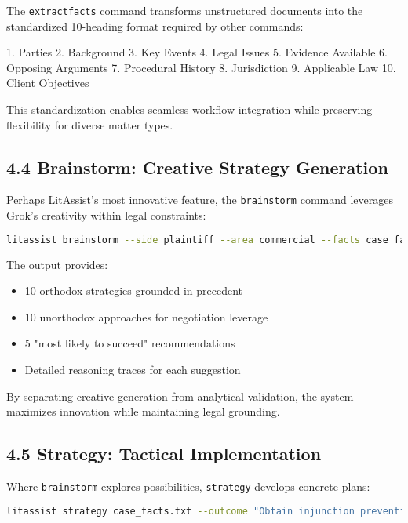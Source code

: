 \documentclass[12pt,a4paper]{article}
\begin{document}
The \texttt{extractfacts} command transforms unstructured documents into the standardized 10-heading format required by other commands:

1. Parties
2. Background  
3. Key Events
4. Legal Issues
5. Evidence Available
6. Opposing Arguments
7. Procedural History
8. Jurisdiction
9. Applicable Law
10. Client Objectives

This standardization enables seamless workflow integration while preserving flexibility for diverse matter types.

\subsection*{4.4 Brainstorm: Creative Strategy Generation}

Perhaps LitAssist's most innovative feature, the \texttt{brainstorm} command leverages Grok's creativity within legal constraints:

\begin{lstlisting}[language=bash]
litassist brainstorm --side plaintiff --area commercial --facts case_facts.txt --research 'outputs/lookup_*.txt'
\end{lstlisting}

The output provides:
\begin{itemize}
\item 10 orthodox strategies grounded in precedent
\item 10 unorthodox approaches for negotiation leverage
\item 5 "most likely to succeed" recommendations
\item Detailed reasoning traces for each suggestion
\end{itemize}

By separating creative generation from analytical validation, the system maximizes innovation while maintaining legal grounding.

\subsection*{4.5 Strategy: Tactical Implementation}

Where \texttt{brainstorm} explores possibilities, \texttt{strategy} develops concrete plans:

\begin{lstlisting}[language=bash]
litassist strategy case_facts.txt --outcome "Obtain injunction preventing asset dissipation" --strategies outputs/brainstorm_*.txt
\end{lstlisting}
\end{document}
